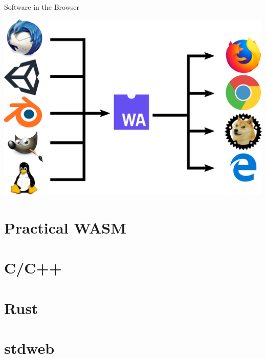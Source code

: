 \documentclass{lug}
\newcommand{\pmidg}[1]{\parbox{\widthof{#1}}{#1}}
\begin{document}
\begin{frame}{Software in the Browser}
    \pmidg{\includegraphics[width=\columnwidth]{graphics/wasm_chain}}
\end{frame}

\renewcommand{\secimage}{graphics/javascript_disabled}
\section{Practical WASM}

\renewcommand{\secimage}{graphics/c_logo}
\section{C/C++}

\renewcommand{\secimage}{graphics/rust_logo}
\section{Rust}

\renewcommand{\secimage}{graphics/stdweb_logo}
\section{stdweb}
\end{document}
